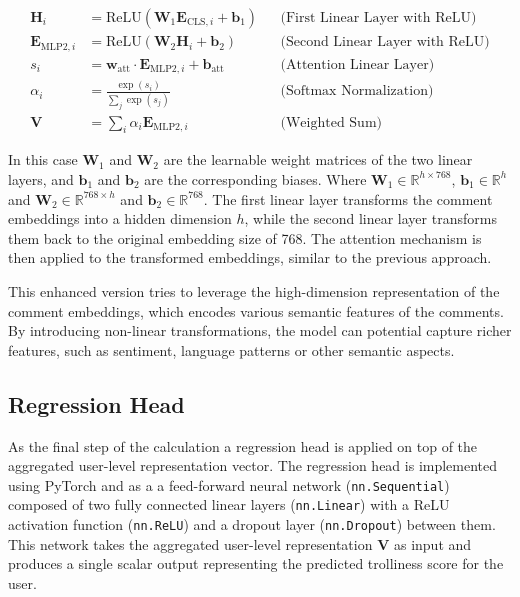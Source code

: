 \documentclass[twoside]{ctuthesis}
\theoremstyle{plain}
\theoremstyle{definition}
\theoremstyle{note}
\begin{document}
\begin{align}
    \mathbf{H}_{i} &= \text{ReLU}(\mathbf{W}_1 \mathbf{E}_{\mathrm{CLS}, i} + \mathbf{b}_1) && \text{(First Linear Layer with ReLU)} \\
    \mathbf{E}_{\mathrm{MLP2}, i} &= \text{ReLU}(\mathbf{W}_2 \mathbf{H}_{i} + \mathbf{b}_2) && \text{(Second Linear Layer with ReLU)} \\
    s_i &= \mathbf{w}_{\mathrm{att}} \cdot \mathbf{E}_{\mathrm{MLP2}, i} + \mathbf{b}_{\mathrm{att}} && \text{(Attention Linear Layer)} \\
    \alpha_i &= \frac{\exp(s_i)}{\sum_{j} \exp(s_j)} && \text{(Softmax Normalization)} \\
    \mathbf{V} &= \sum_i \alpha_i \mathbf{E}_{\mathrm{MLP2}, i} && \text{(Weighted Sum)}
\end{align}

In this case \( \mathbf{W}_1 \) and \( \mathbf{W}_2 \) are the learnable weight matrices of the two linear layers, and \( \mathbf{b}_1 \) and \( \mathbf{b}_2 \) are the corresponding biases. Where \( \mathbf{W}_1 \in \mathbb{R}^{h \times 768} \), \( \mathbf{b}_1 \in \mathbb{R}^{h} \) and  \( \mathbf{W}_2 \in \mathbb{R}^{768 \times h} \) and \( \mathbf{b}_2 \in \mathbb{R}^{768} \). The first linear layer transforms the comment embeddings into a hidden dimension \( h \), while the second linear layer transforms them back to the original embedding size of 768. The attention mechanism is then applied to the transformed embeddings, similar to the previous approach. \par

This enhanced version tries to leverage the high-dimension representation of the comment embeddings, which encodes various semantic features of the comments. By introducing non-linear transformations, the model can potential capture richer features, such as sentiment, language patterns or other semantic aspects.\par 

\subsection{Regression Head}

As the final step of the calculation a regression head is applied on top of the aggregated user-level representation vector. The regression head is implemented using PyTorch and as a a feed-forward neural network (\texttt{nn.Sequential}) composed of two fully connected linear layers (\texttt{nn.Linear}) with a ReLU activation function (\texttt{nn.ReLU}) and a dropout layer (\texttt{nn.Dropout}) between them. This network takes the aggregated user-level representation \( \mathbf{V} \) as input and produces a single scalar output representing the predicted trolliness score for the user.\par
\end{document}
